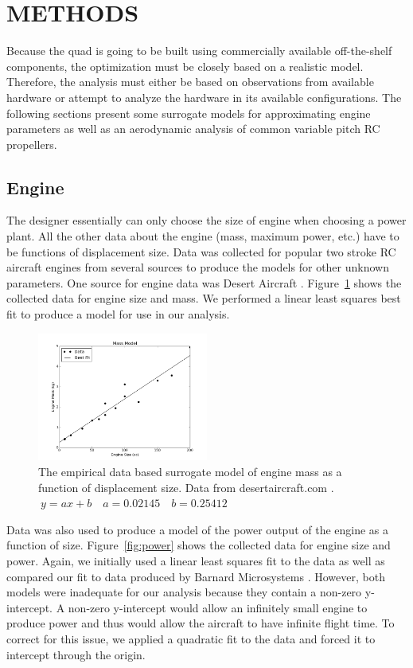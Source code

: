 \documentclass[letterpaper, 10 pt, conference]{ieeeconf}  %
\begin{document}
\section{METHODS}

Because the quad is going to be built using commercially available off-the-shelf components, the optimization must be closely based on a realistic model. Therefore, the analysis must either be based on observations from available hardware or attempt to analyze the hardware in its available configurations.  The following sections present some surrogate models for approximating engine parameters as well as an aerodynamic analysis of common variable pitch RC propellers. 

\subsection{Engine} 

The designer essentially can only choose the size of engine when choosing a power plant. All the other data about the engine (mass, maximum power, etc.) have to be functions of displacement size.  Data was collected for popular two stroke RC aircraft engines from several sources to produce the models for other unknown parameters. One source for engine data was Desert Aircraft \cite{da2016}.  Figure~\ref{fig:mass} shows the collected data for engine size and mass.  We performed a linear least squares best fit to produce a model for use in our analysis.

\begin{figure}
	\includegraphics[width=0.5\textwidth]{mass.png}
	\caption{The empirical data based surrogate model of engine mass as a function of displacement size. Data from desertaircraft.com \cite{da2016}. $\ y = ax + b \quad a = 0.02145 \quad b = 0.25412$}
		\label{fig:mass}
\end{figure}

Data was also used to produce a model of the power output of the engine as a function of size. Figure~\ref{fig:power} shows the collected data for engine size and power.  Again, we initially used a linear least squares fit to the data as well as compared our fit to data produced by Barnard Microsystems \cite{barnardmiro2016}. However, both models were inadequate for our analysis because they contain a non-zero y-intercept.  A non-zero y-intercept would allow an infinitely small engine to produce power and thus would allow the aircraft to have infinite flight time. To correct for this issue, we applied a quadratic fit to the data and forced it to intercept through the origin.
\end{document}
